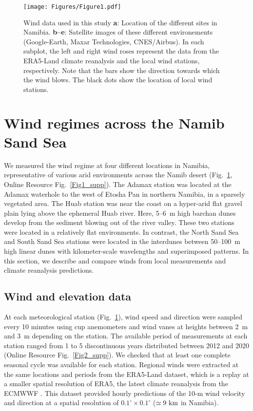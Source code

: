 \begin{figure}[t]
\centering
\texttt{[image: Figures/Figure1.pdf]}
\caption{Wind data used in this study \textbf{a}: Location of the different sites in Namibia. \textbf{b--e}: Satellite images of these different environements (Google-Earth, Maxar Technologies, CNES/Airbus). In each subplot, the left and right wind roses represent the data from the ERA5-Land climate reanalysis and the local wind stations, respectively. Note that the bars show the direction towards which the wind blows. The black dots show the location of local wind stations.}
\label{Fig1}
\end{figure}


\section{Wind regimes across the Namib Sand Sea}
We measured the wind regime at four different locations in Namibia, representative of various arid environments across the Namib desert (Fig.~\ref{Fig1}, Online Resource Fig.~\ref{Fig1_supp}). The Adamax station was located at the Adamax waterhole to the west of Etosha Pan in northern Namibia, in a sparsely vegetated area. The Huab station was near the coast on a hyper-arid flat gravel plain lying above the ephemeral Huab river. Here, 5--6~m high barchan dunes develop from the sediment blowing out of the river valley. These two stations were located in a relatively flat environments. In contrast, the North Sand Sea and South Sand Sea stations were located in the interdunes between 50--100~m high linear dunes with kilometer-scale wavelengths and superimposed patterns. In this section, we describe and compare winds from local measurements and climate reanalysis predictions.

\subsection{Wind and elevation data}
At each meteorological station (Fig.~\ref{Fig1}), wind speed and direction were sampled every 10 minutes using cup anemometers and wind vanes at heights between 2~m and 3~m depending on the station. The available period of measurements at each station ranged from 1 to 5 discontinuous years distributed between 2012 and 2020 (Online Resource Fig.~\ref{Fig2_supp}). We checked that at least one complete seasonal cycle was available for each station. Regional winds were extracted at the same locations and periods from the ERA5-Land dataset, which is a replay at a smaller spatial resolution of ERA5, the latest climate reanalysis from the ECMWWF \citep{Hersbach2020, munoz2021}. This dataset provided hourly predictions of the 10-m wind velocity and direction at a spatial resolution of $0.1^\circ\times0.1^\circ$ ($\simeq 9~\textup{km}$ in Namibia).

